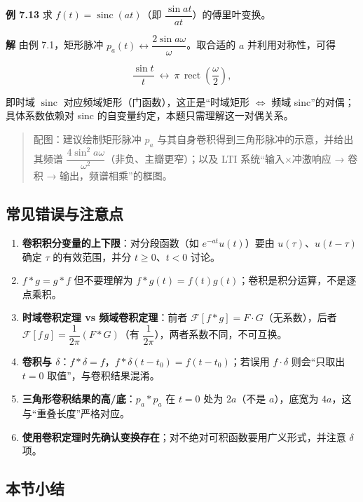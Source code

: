 \textbf{例 7.13} 求 \(f(t)=\operatorname{sinc}(at)\)（即
\(\dfrac{\sin at}{at}\)）的傅里叶变换。

\textbf{解} 由例 7.1，矩形脉冲
\(p_{a}(t)\leftrightarrow \dfrac{2\sin a\omega}{\omega}\)。取合适的
\(a\) 并利用对称性，可得

\[
\frac{\sin t}{t}\ \longleftrightarrow\ \pi\,\operatorname{rect}\left(\frac{\omega}{2}\right),
\]

即时域 \(\operatorname{sinc}\) 对应频域矩形（门函数），这正是``时域矩形
\(\Longleftrightarrow\) 频域 sinc''的对偶；具体系数依赖对 sinc
的自变量约定，本题只需理解这一对偶关系。

\begin{quote}
配图：建议绘制矩形脉冲 \(p_a\)
与其自身卷积得到三角形脉冲的示意，并给出其频谱
\(\dfrac{4\sin^2 a\omega}{\omega^2}\)（非负、主瓣更窄）；以及 LTI
系统``输入×冲激响应 → 卷积 → 输出，频谱相乘''的框图。
\end{quote}

\subsection{常见错误与注意点}\label{ux5e38ux89c1ux9519ux8befux4e0eux6ce8ux610fux70b9-20}

\begin{enumerate}
\def\labelenumi{\arabic{enumi}.}
\tightlist
\item
  \textbf{卷积积分变量的上下限}：对分段函数（如 \(e^{-at}u(t)\)）要由
  \(u(\tau)\)、\(u(t-\tau)\) 确定 \(\tau\) 的有效范围，并分
  \(t\ge0\)、\(t<0\) 讨论。
\item
  \textbf{\(f*g=g*f\)} 但不要理解为
  \(f*g(t)=f(t)g(t)\)；卷积是积分运算，不是逐点乘积。
\item
  \textbf{时域卷积定理 vs 频域卷积定理}：前者
  \(\mathcal F[f*g]=F\cdot G\)（无系数），后者
  \(\mathcal F[f\, g]=\dfrac{1}{2\pi}(F*G)\)（有
  \(\dfrac{1}{2\pi}\)），两者系数不同，不可互换。
\item
  \textbf{卷积与
  \(\delta\)}：\(f*\delta=f\)，\(f*\delta(t-t_0)=f(t-t_0)\)；若误用
  \(f\cdot\delta\) 则会``只取出 \(t=0\) 取值''，与卷积结果混淆。
\item
  \textbf{三角形卷积结果的高/底}：\(p_a*p_a\) 在 \(t=0\) 处为
  \(2a\)（不是 \(a\)），底宽为 \(4a\)，这与``重叠长度''严格对应。
\item
  \textbf{使用卷积定理时先确认变换存在}；对不绝对可积函数要用广义形式，并注意
  \(\delta\) 项。
\end{enumerate}

\subsection{本节小结}\label{ux672cux8282ux5c0fux7ed3-20}


